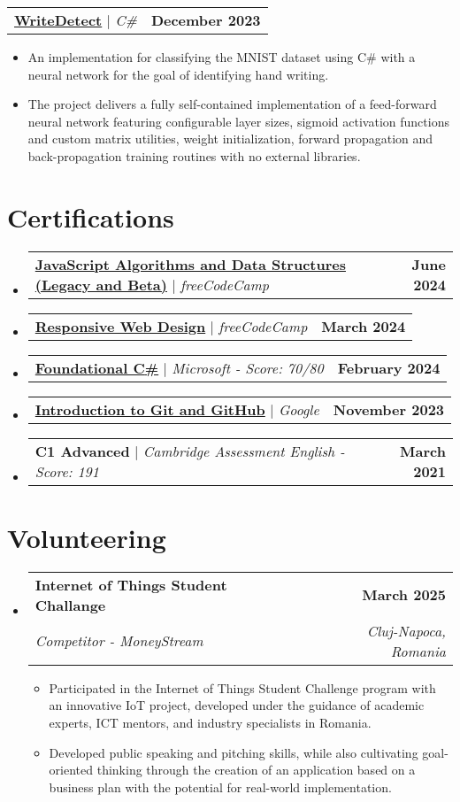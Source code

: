 \documentclass[letterpaper,11pt]{article}
\makeatletter
\newcommand{\resumeItem}[1]{
  \item\small{
    {#1 \vspace{-2pt}}
  }
}
\newcommand{\resumeSubheading}[4]{
  \vspace{-2pt}\item
    \begin{tabular*}{1.0\textwidth}[t]{l@{\extracolsep{\fill}}r}
      \textbf{#1} & \textbf{\small #2} \\
      \textit{\small#3} & \textit{\small #4} \\
    \end{tabular*}\vspace{-7pt}
}
\newcommand{\resumeProjectHeading}[2]{
    \item
    \begin{tabular*}{1.001\textwidth}{l@{\extracolsep{\fill}}r}
      \small#1 & \textbf{\small #2}\\
    \end{tabular*}\vspace{-7pt}
}
\newcommand{\resumeSubHeadingListStart}{\begin{itemize}[leftmargin=0.0in, label={}]}
\newcommand{\resumeSubHeadingListEnd}{\end{itemize}}
\newcommand{\resumeItemListStart}{\begin{itemize}}
\newcommand{\resumeItemListEnd}{\end{itemize}\vspace{-5pt}}
\makeatother
\begin{document}
\vspace{-15pt}
      \resumeProjectHeading
          {\textbf{\href{https://github.com/BogdanBargaoanu/WriteDetect}{WriteDetect}} $|$ \emph{\mbox{C{\#}}}}{December 2023}
          \resumeItemListStart
            \resumeItem{An implementation for classifying the MNIST dataset using \mbox{C{\#}} with a neural network for the goal of identifying hand writing.}
            \resumeItem{The project delivers a fully self-contained implementation of a feed-forward neural network featuring configurable layer sizes, sigmoid activation functions and custom matrix utilities, weight initialization, forward propagation and back-propagation training routines with no external libraries.}
          \resumeItemListEnd 
 \vspace{-5pt}




\section{Certifications}
    \resumeSubHeadingListStart
      \resumeProjectHeading
          {\textbf{\href{https://www.freecodecamp.org/certification/BogdanBargaoanu/javascript-algorithms-and-data-structures-v8}{JavaScript Algorithms and Data Structures (Legacy and Beta)}} $|$ \emph{freeCodeCamp}}{June 2024}
      \resumeProjectHeading
          {\textbf{\href{https://www.freecodecamp.org/certification/BogdanBargaoanu/responsive-web-design}{Responsive Web Design}} $|$ \emph{freeCodeCamp}}{March 2024}
      \resumeProjectHeading
          {\textbf{\href{https://www.freecodecamp.org/certification/BogdanBargaoanu/foundational-c-sharp-with-microsoft}{Foundational \mbox{C{\#}}}} $|$ \emph{Microsoft - Score: 70/80}}{February 2024}
      \resumeProjectHeading
          {\textbf{\href{https://www.coursera.org/account/accomplishments/verify/QZM6LUS5NGQK}{Introduction to Git and GitHub}} $|$ \emph{Google}}{November 2023}
      \resumeProjectHeading
          {\textbf{C1 Advanced} $|$ \emph{Cambridge Assessment English - Score: 191}}{March 2021}
    \resumeSubHeadingListEnd
\section{Volunteering}
    \resumeSubHeadingListStart
        \resumeSubheading{Internet of Things Student Challange }{March 2025}{Competitor - MoneyStream }{Cluj-Napoca, Romania}
        \vspace{2pt}
            \resumeItemListStart
                \resumeItem{Participated in the Internet of Things Student Challenge program with an innovative IoT project, developed under the guidance of academic experts, ICT mentors, and industry specialists in Romania.}
                \resumeItem{Developed public speaking and pitching skills, while also cultivating goal-oriented thinking through the creation of an application based on a business plan with the potential for real-world implementation.}
            \resumeItemListEnd
    \resumeSubHeadingListEnd
%
\end{document}
